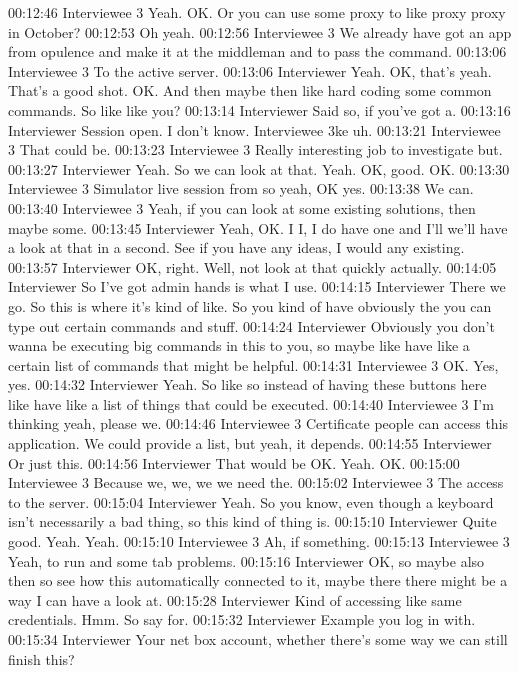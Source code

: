 00:12:46 Interviewee 3
Yeah. OK. Or you can use some proxy to like proxy proxy in October?
00:12:53
Oh yeah.
00:12:56 Interviewee 3
We already have got an app from opulence and make it at the middleman and to pass the command.
00:13:06 Interviewee 3
To the active server.
00:13:06 Interviewer
Yeah. OK, that's yeah. That's a good shot. OK. And then maybe then like hard coding some common commands. So like like you?
00:13:14 Interviewer
Said so, if you've got a.
00:13:16 Interviewer
Session open. I don't know. Interviewee 3ke uh.
00:13:21 Interviewee 3
That could be.
00:13:23 Interviewee 3
Really interesting job to investigate but.
00:13:27 Interviewer
Yeah. So we can look at that. Yeah. OK, good. OK.
00:13:30 Interviewee 3
Simulator live session from so yeah, OK yes.
00:13:38
We can.
00:13:40 Interviewee 3
Yeah, if you can look at some existing solutions, then maybe some.
00:13:45 Interviewer
Yeah, OK. I I, I do have one and I'll we'll have a look at that in a second. See if you have any ideas, I would any existing.
00:13:57 Interviewer
OK, right. Well, not look at that quickly actually.
00:14:05 Interviewer
So I've got admin hands is what I use.
00:14:15 Interviewer
There we go. So this is where it's kind of like. So you kind of have obviously the you can type out certain commands and stuff.
00:14:24 Interviewer
Obviously you don't wanna be executing big commands in this to you, so maybe like have like a certain list of commands that might be helpful.
00:14:31 Interviewee 3
OK. Yes, yes.
00:14:32 Interviewer
Yeah. So like so instead of having these buttons here like have like a list of things that could be executed.
00:14:40 Interviewee 3
I'm thinking yeah, please we.
00:14:46 Interviewee 3
Certificate people can access this application. We could provide a list, but yeah, it depends.
00:14:55 Interviewer
Or just this.
00:14:56 Interviewer
That would be OK. Yeah. OK.
00:15:00 Interviewee 3
Because we, we, we we need the.
00:15:02 Interviewee 3
The access to the server.
00:15:04 Interviewer
Yeah. So you know, even though a keyboard isn't necessarily a bad thing, so this kind of thing is.
00:15:10 Interviewer
Quite good. Yeah. Yeah.
00:15:10 Interviewee 3
Ah, if something.
00:15:13 Interviewee 3
Yeah, to run and some tab problems.
00:15:16 Interviewer
OK, so maybe also then so see how this automatically connected to it, maybe there there might be a way I can have a look at.
00:15:28 Interviewer
Kind of accessing like same credentials. Hmm. So say for.
00:15:32 Interviewer
Example you log in with.
00:15:34 Interviewer
Your net box account, whether there's some way we can still finish this?
